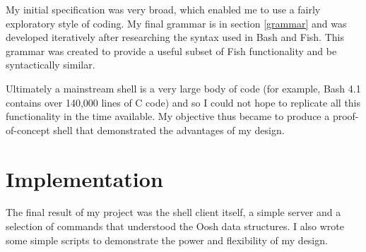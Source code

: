 \documentclass[12pt,twoside,notitlepage]{report}
\begin{document}
My initial specification was very broad, which enabled me to use a
fairly exploratory style of coding. My final grammar is in section
\ref{grammar} and was developed iteratively after researching the
syntax used in Bash and Fish. This grammar was created to provide a
useful subset of Fish functionality and be syntactically similar.

Ultimately a mainstream shell is a very large body of code (for
example, Bash 4.1 contains over 140,000 lines of C
code\footnotemark[1]) and so I could not hope to replicate all this
functionality in the time available. My objective thus became to
produce a proof-of-concept shell that demonstrated the advantages of
my design.







\cleardoublepage

\chapter{Implementation}
The final result of my project was the shell client itself, a simple server and
a selection of commands that understood the Oosh data structures. I also wrote
some simple scripts to demonstrate the power and flexibility of my design.
\end{document}
